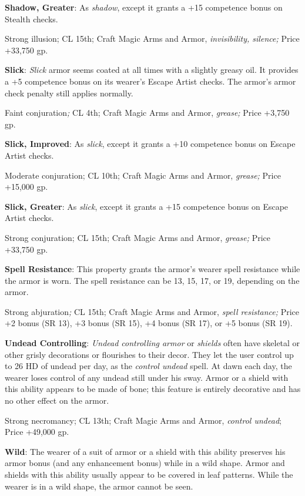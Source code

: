\textbf{Shadow, Greater}: As \textit{shadow}, except it grants a +15 competence bonus on Stealth checks.
				
Strong illusion; CL 15th; Craft Magic Arms and Armor, \textit{invisibility, silence; }Price +33,750 gp.
				
\textbf{Slick}: \textit{Slick} armor seems coated at all times with a slightly greasy oil. It provides a +5 competence bonus on its wearer's Escape Artist checks. The armor's armor check penalty still applies normally.
				
Faint conjuration\textit{; }CL 4th; Craft Magic Arms and Armor, \textit{grease; }Price +3,750 gp.
				
\textbf{Slick, Improved}: As \textit{slick}, except it grants a +10 competence bonus on Escape Artist checks.
				
Moderate conjuration; CL 10th; Craft Magic Arms and Armor, \textit{grease; }Price +15,000 gp.
				
\textbf{Slick, Greater}: As \textit{slick}, except it grants a +15 competence bonus on Escape Artist checks.
				
Strong conjuration; CL 15th; Craft Magic Arms and Armor, \textit{grease; }Price +33,750 gp.
				
\textbf{Spell Resistance}: This property grants the armor's wearer spell resistance while the armor is worn. The spell resistance can be 13, 15, 17, or 19, depending on the armor.
				
Strong abjuration\textit{; }CL 15th; Craft Magic Arms and Armor, \textit{spell resistance; }Price +2 bonus (SR 13), +3 bonus (SR 15), +4 bonus (SR 17), or +5 bonus (SR 19).
				
\textbf{Undead Controlling}: \textit{Undead controlling armor} or \textit{shields} often have skeletal or other grisly decorations or flourishes to their decor. They let the user control up to 26 HD of undead per day, as the \textit{control undead }spell. At dawn each day, the wearer loses control of any undead still under his sway. Armor or a shield with this ability appears to be made of bone; this feature is entirely decorative and has no other effect on the armor.
				
Strong necromancy; CL 13th; Craft Magic Arms and Armor, \textit{control undead}; Price +49,000 gp.
				
\textbf{Wild}: The wearer of a suit of armor or a shield with this ability preserves his armor bonus (and any enhancement bonus) while in a wild shape. Armor and shields with this ability usually appear to be covered in leaf patterns. While the wearer is in a wild shape, the armor cannot be seen.
				
